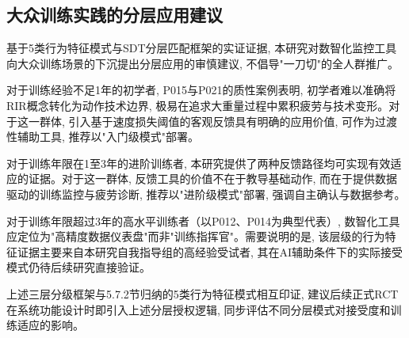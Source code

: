 \subsection{大众训练实践的分层应用建议}
\label{sec:practice_recommendations}

基于5类行为特征模式与SDT分层匹配框架的实证证据, 本研究对数智化监控工具向大众训练场景的下沉提出分层应用的审慎建议, 不倡导"一刀切"的全人群推广。

对于训练经验不足1年的初学者, P015与P021的质性案例表明, 初学者难以准确将RIR概念转化为动作技术边界, 极易在追求大重量过程中累积疲劳与技术变形。对于这一群体, 引入基于速度损失阈值的客观反馈具有明确的应用价值, 可作为过渡性辅助工具, 推荐以"入门级模式"部署。

对于训练年限在1至3年的进阶训练者, 本研究提供了两种反馈路径均可实现有效适应的证据。对于这一群体, 反馈工具的价值不在于教导基础动作, 而在于提供数据驱动的训练监控与疲劳诊断, 推荐以"进阶级模式"部署, 强调自主确认与数据参考。

对于训练年限超过3年的高水平训练者（以P012、P014为典型代表）, 数智化工具应定位为"高精度数据仪表盘"而非"训练指挥官"。需要说明的是, 该层级的行为特征证据主要来自本研究自我指导组的高经验受试者, 其在AI辅助条件下的实际接受模式仍待后续研究直接验证。

上述三层分级框架与5.7.2节归纳的5类行为特征模式相互印证, 建议后续正式RCT在系统功能设计时即引入上述分层授权逻辑, 同步评估不同分层模式对接受度和训练适应的影响。
